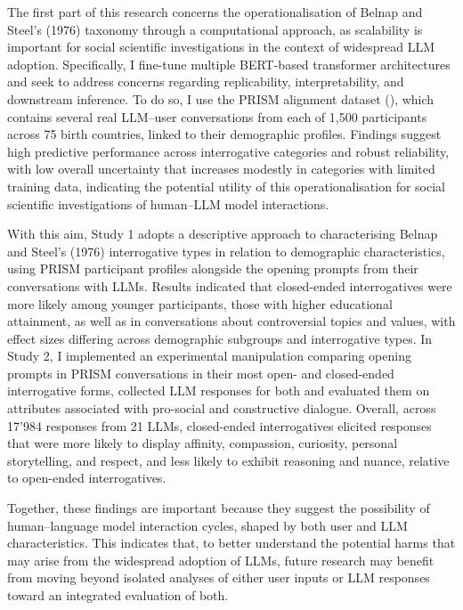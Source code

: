 \documentclass[
  12pt,
]{article}
\begin{document}
The first part of this research concerns the operationalisation of Belnap and Steel's (1976) taxonomy through a computational approach, as scalability is important for social scientific investigations in the context of widespread LLM adoption. Specifically, I fine-tune multiple BERT-based transformer architectures and seek to address concerns regarding replicability, interpretability, and downstream inference. To do so, I use the PRISM alignment dataset (), which contains several real LLM--user conversations from each of 1,500 participants across 75 birth countries, linked to their demographic profiles. Findings suggest high predictive performance across interrogative categories and robust reliability, with low overall uncertainty that increases modestly in categories with limited training data, indicating the potential utility of this operationalisation for social scientific investigations of human--LLM model interactions.

With this aim, Study 1 adopts a descriptive approach to characterising Belnap and Steel's (1976) interrogative types in relation to demographic characteristics, using PRISM participant profiles alongside the opening prompts from their conversations with LLMs. Results indicated that closed-ended interrogatives were more likely among younger participants, those with higher educational attainment, as well as in conversations about controversial topics and values, with effect sizes differing across demographic subgroups and interrogative types. In Study 2, I implemented an experimental manipulation comparing opening prompts in PRISM conversations in their most open- and closed-ended interrogative forms, collected LLM responses for both and evaluated them on attributes associated with pro-social and constructive dialogue. Overall, across 17'984 responses from 21 LLMs, closed-ended interrogatives elicited responses that were more likely to display affinity, compassion, curiosity, personal storytelling, and respect, and less likely to exhibit reasoning and nuance, relative to open-ended interrogatives.

Together, these findings are important because they suggest the possibility of human--language model interaction cycles, shaped by both user and LLM characteristics. This indicates that, to better understand the potential harms that may arise from the widespread adoption of LLMs, future research may benefit from moving beyond isolated analyses of either user inputs or LLM responses toward an integrated evaluation of both.
\end{document}
